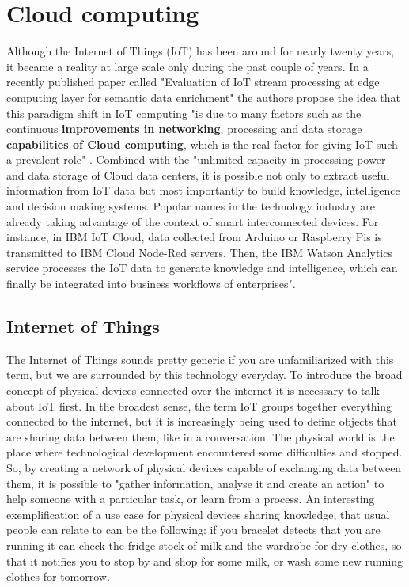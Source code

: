 \section{Cloud computing}

Although the Internet of Things (IoT) has been around for nearly twenty years, it became a reality at large scale only during the past couple of years. In a recently published paper called "Evaluation of IoT stream processing at edge computing layer for semantic data enrichment" the authors propose the idea that this paradigm shift in IoT computing "is due to many factors such as the continuous \textbf{improvements in networking}, processing and data storage \textbf{capabilities of Cloud computing}, which is the real factor for giving IoT such a prevalent role" \cite{xhafa_evaluation_2020}. Combined with the "unlimited capacity in processing power and data storage of Cloud data centers, it is possible not only to extract useful information from IoT data but most importantly to build knowledge, intelligence and decision making systems. Popular names in the technology industry are already taking advantage of the context of smart interconnected devices. For instance, in IBM IoT Cloud, data collected from Arduino or Raspberry Pis is transmitted to IBM Cloud Node-Red servers. Then, the IBM Watson Analytics service processes the IoT data to generate knowledge and intelligence, which can finally be integrated into business workflows of enterprises". \cite{xhafa_evaluation_2020}

\subsection{Internet of Things}

The Internet of Things sounds pretty generic if you are unfamiliarized with this term, but we are surrounded by this technology everyday. To introduce the broad concept of physical devices connected over the internet it is necessary to talk about IoT first. In the broadest sense, the term IoT groups together everything connected to the internet, but it is increasingly being used to define objects that are sharing data between them, like in a conversation. The physical world is the place where technological development encountered some difficulties and stopped. So, by creating a network of physical devices capable of exchanging data between them, it is possible to "gather information, analyse it and create an action" to help someone with a particular task, or learn from a process. \cite{WiredIoT} An interesting exemplification of a use case for physical devices sharing knowledge, that usual people can relate to can be the following: if you bracelet detects that you are running it can check the fridge stock of milk and the wardrobe for dry clothes, so that it notifies you to stop by and shop for some milk, or wash some new running clothes for tomorrow. 

